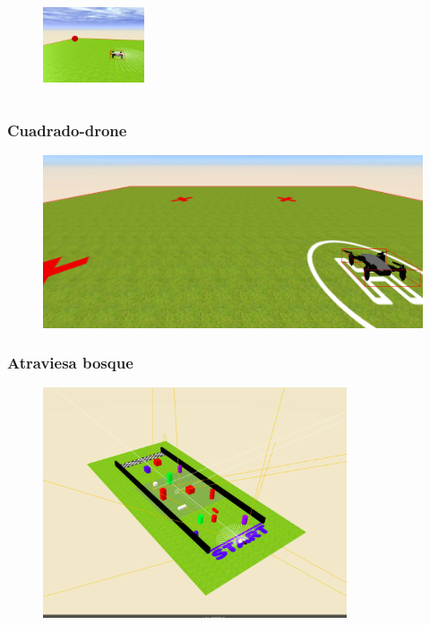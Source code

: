 \documentclass[xcolor={table}]{beamer}
\begin{document}
\begin{frame}
\begin{subfigure}{\textwidth}
            \label{fig:figure2_7}
            \end{subfigure}\hfill
            \begin{subfigure}{\textwidth}
                \includegraphics[width=3cm, height=3cm]{img/followBallTello8.png}
            \label{fig:figure2_8}
            \end{subfigure}
		\end{frame}
		
		
		\begin{frame}
			\frametitle{Cuadrado-drone}
					\begin{figure}{\textwidth}
    		\centering
             \includegraphics[scale=0.4]{img/cuadradoDrone.png}
             \label{fig:configuracion}
            \end{figure}
		\end{frame}
		\begin{frame}
			\frametitle{Atraviesa bosque}
       \begin{figure}
         \href{https://youtu.be/z3n47wWHDFc}
              {\includegraphics[width=0.8\textwidth]{img/atraviesabosque-indiv.png}}
       \end{figure}

		\end{frame}
\end{document}
